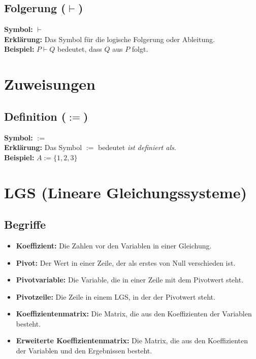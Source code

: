\documentclass[12pt,a4paper]{article}
\begin{document}
\subsection{Folgerung (\texorpdfstring{$\vdash$}{vdash})}
\textbf{Symbol:} $\vdash$ \\
\textbf{Erklärung:} Das Symbol für die logische Folgerung oder Ableitung. \\
\textbf{Beispiel:} $P \vdash Q$ bedeutet, dass $Q$ aus $P$ folgt.
\section{Zuweisungen}

\subsection{Definition (\texorpdfstring{$:=$}{:=})}
\textbf{Symbol:} $:=$ \\
\textbf{Erklärung:} Das Symbol $:=$ bedeutet \textit{ist definiert als}. \\
\textbf{Beispiel:} $A := \{1,2,3\}$


\section{LGS (Lineare Gleichungssysteme)}
\subsection{Begriffe}
\begin{itemize}
    \item \textbf{Koeffizient:} Die Zahlen vor den Variablen in einer Gleichung.
    \item \textbf{Pivot:} Der Wert in einer Zeile, der als erstes von Null verschieden ist.
    \item \textbf{Pivotvariable:} Die Variable, die in einer Zeile mit dem Pivotwert steht.
    \item \textbf{Pivotzeile:} Die Zeile in einem LGS, in der der Pivotwert steht.
    \item \textbf{Koeffizientenmatrix:} Die Matrix, die aus den Koeffizienten der Variablen besteht.
    \item \textbf{Erweiterte Koeffizientenmatrix:} Die Matrix, die aus den Koeffizienten der Variablen und den Ergebnissen besteht.
\end{itemize}
\end{document}
